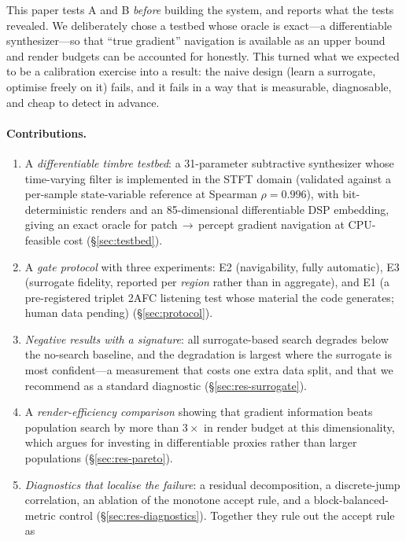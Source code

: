 \documentclass[11pt]{article}
\begin{document}
This paper tests A and B \emph{before} building the system, and reports what the
tests revealed. We deliberately chose a testbed whose oracle is exact---a
differentiable synthesizer---so that ``true gradient'' navigation is available
as an upper bound and render budgets can be accounted for honestly. This turned
what we expected to be a calibration exercise into a result: the naive design
(learn a surrogate, optimise freely on it) fails, and it fails in a way that is
measurable, diagnosable, and cheap to detect in advance.

\paragraph{Contributions.}
\begin{enumerate}[label=(\arabic*)]
\item A \emph{differentiable timbre testbed}: a 31-parameter subtractive
  synthesizer whose time-varying filter is implemented in the STFT domain
  (validated against a per-sample state-variable reference at Spearman
  $\rho=0.996$), with bit-deterministic renders and an 85-dimensional
  differentiable DSP embedding, giving an exact oracle for
  patch\,$\rightarrow$\,percept gradient navigation at CPU-feasible cost
  (\S\ref{sec:testbed}).
\item A \emph{gate protocol} with three experiments: E2 (navigability, fully
  automatic), E3 (surrogate fidelity, reported per \emph{region} rather than in
  aggregate), and E1 (a pre-registered triplet 2AFC listening test whose
  material the code generates; human data pending) (\S\ref{sec:protocol}).
\item \emph{Negative results with a signature}: all surrogate-based search
  degrades below the no-search baseline, and the degradation is largest where
  the surrogate is most confident---a measurement that costs one extra data
  split, and that we recommend as a standard diagnostic
  (\S\ref{sec:res-surrogate}).
\item A \emph{render-efficiency comparison} showing that gradient information
  beats population search by more than $3\times$ in render budget at this
  dimensionality, which argues for investing in differentiable proxies rather
  than larger populations (\S\ref{sec:res-pareto}).
\item \emph{Diagnostics that localise the failure}: a residual
  decomposition, a discrete-jump correlation, an ablation of the monotone
  accept rule, and a block-balanced-metric control
  (\S\ref{sec:res-diagnostics}). Together they rule out the accept rule as

\end{enumerate}
\end{document}
